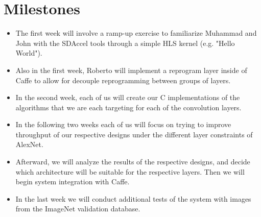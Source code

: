\documentclass[conference,compsoc]{IEEEtran/IEEEtran}
\begin{document}
\section{Milestones}\label{section:milestones}
\begin{itemize}
    \item The first week will involve a ramp-up exercise to familiarize Muhammad and John with the SDAccel tools through a simple HLS kernel (e.g. "Hello World").
    \item Also in the first week, Roberto will implement a reprogram layer inside of Caffe to allow for decouple reprogramming between groups of layers.
    \item In the second week, each of us will create our C implementations of the algorithms that we are each targeting for each of the convolution layers.
    \item In the following two weeks each of us will focus on trying to improve throughput of our respective designs under the different layer constraints of AlexNet.
    \item Afterward, we will analyze the results of the respective designs, and decide which architecture will be suitable for the respective layers. Then we will begin system integration with Caffe.
    \item In the last week we will conduct additional tests of the system with images from the ImageNet validation database.
\end{itemize}




\end{document}

